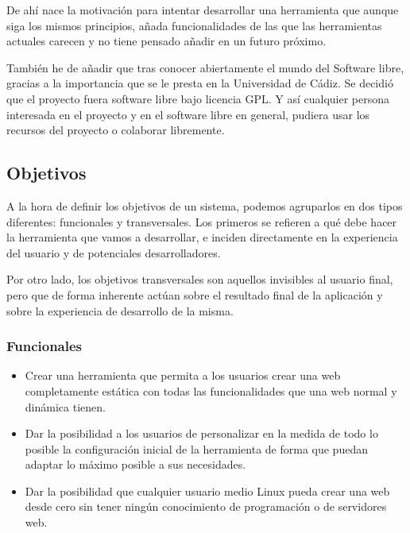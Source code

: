 \documentclass[a4paper,12pt]{article}
\begin{document}
De ahí nace la motivación para intentar desarrollar una herramienta que aunque siga los mismos principios,
añada funcionalidades de las que las herramientas actuales carecen y no tiene pensado añadir en un futuro
próximo.

También he de añadir que tras conocer abiertamente el mundo del Software libre, gracias a la importancia
que se le presta en la Universidad de Cádiz. Se decidió que el proyecto fuera software libre bajo
licencia GPL. Y así cualquier persona interesada en el proyecto y en el software libre
en general, pudiera usar los recursos del proyecto o colaborar libremente.

\subsection{Objetivos}

A la hora de definir los objetivos de un sistema, podemos agruparlos en dos tipos
diferentes: funcionales y transversales. Los primeros se refieren a qué debe hacer
la herramienta que vamos a desarrollar, e inciden directamente en la experiencia del
usuario y de potenciales desarrolladores.

Por otro lado, los objetivos transversales son aquellos invisibles al usuario final,
pero que de forma inherente actúan sobre el resultado final de la aplicación y
sobre la experiencia de desarrollo de la misma.

\subsubsection{Funcionales}
\begin{itemize}
\item Crear una herramienta que permita a los usuarios crear una web completamente estática
con todas las funcionalidades que una web normal y dinámica tienen.
\item Dar la posibilidad a los usuarios de personalizar en la medida de todo lo posible la configuración
inicial de la herramienta de forma que puedan adaptar lo máximo posible a sus necesidades.
\item Dar la posibilidad que cualquier usuario medio Linux pueda crear una web desde cero sin tener
ningún conocimiento de programación o de servidores web.
\end{itemize}
\end{document}
